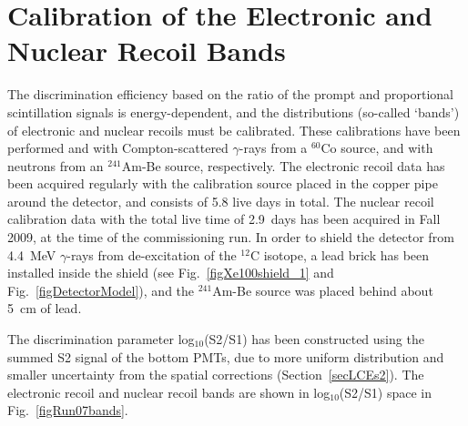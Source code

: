 \section{Calibration of the Electronic and Nuclear Recoil Bands}
\label{secBandCalibration}

The discrimination efficiency based on the ratio of the prompt and proportional scintillation signals is energy-dependent, and the distributions (so-called `bands') of electronic and nuclear recoils must be calibrated. 
These calibrations have been performed and with Compton-scattered $\gamma$-rays from a $^{60}$Co source, and with neutrons from an $^{241}$Am-Be source, respectively. The electronic recoil data has been acquired regularly with the calibration source placed in the copper pipe around the detector, and consists of 5.8 live days in total. The nuclear recoil calibration data with the total live time of 2.9~days has been acquired in Fall 2009, at the time of the commissioning run. In order to shield the detector from 4.4~MeV $\gamma$-rays from de-excitation of the $^{12}$C isotope, a lead brick has been installed inside the shield (see Fig.~\ref{figXe100shield_1} and Fig.~\ref{figDetectorModel}), and the $^{241}$Am-Be source was placed behind about 5~cm of lead. 

The discrimination parameter log$_{10}$(S2/S1) has been constructed using the summed S2 signal of the bottom PMTs, due to more uniform distribution and smaller uncertainty from the spatial corrections (Section~\ref{secLCEs2}). The electronic recoil and nuclear recoil bands are shown in log$_{10}$(S2/S1) space in Fig.~\ref{figRun07bands}.

